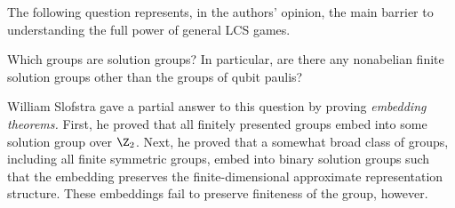The following question represents, in the authors' opinion, the main barrier to understanding the full power of general LCS games.
\begin{question}
	Which groups are solution groups? In particular, are there any nonabelian finite solution groups other than the groups of qubit paulis?
\end{question}
William Slofstra gave a partial answer to this question by proving \emph{embedding theorems.} First, he proved \cite{slofstra2016tsirelson} that all finitely presented groups embed into some solution group over $\Z_2$. Next, he proved \cite{slofstra2017set} that a somewhat broad class of groups, including all finite symmetric groups, embed into binary solution groups such that the embedding preserves the finite-dimensional approximate representation structure. These embeddings fail to preserve finiteness of the group, however.


